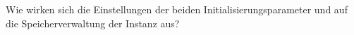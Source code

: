       \item Wie wirken sich die Einstellungen der beiden Initialisierungsparameter  und  auf die Speicherverwaltung der Instanz aus?
